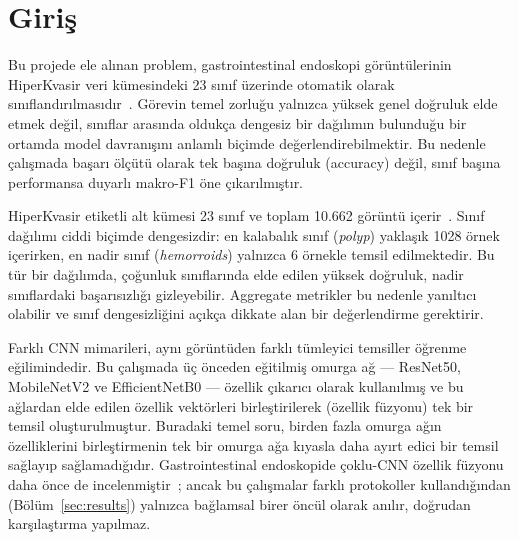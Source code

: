 \section{Giriş}
\label{sec:introduction}

Bu projede ele alınan problem, gastrointestinal endoskopi görüntülerinin
HiperKvasir veri kümesindeki 23 sınıf üzerinde otomatik olarak
sınıflandırılmasıdır~\cite{borgli2020hyperkvasir}. Görevin temel zorluğu yalnızca
yüksek genel doğruluk elde etmek değil, sınıflar arasında oldukça dengesiz bir
dağılımın bulunduğu bir ortamda model davranışını anlamlı biçimde
değerlendirebilmektir. Bu nedenle çalışmada başarı ölçütü olarak tek başına
doğruluk (accuracy) değil, sınıf başına performansa duyarlı makro-F1 öne
çıkarılmıştır.

HiperKvasir etiketli alt kümesi 23 sınıf ve toplam 10.662 görüntü
içerir~\cite{borgli2020hyperkvasir}. Sınıf dağılımı ciddi biçimde dengesizdir:
en kalabalık sınıf (\textit{polyp}) yaklaşık 1028 örnek içerirken, en nadir
sınıf (\textit{hemorroids}) yalnızca 6 örnekle temsil edilmektedir.
Bu tür bir dağılımda, çoğunluk sınıflarında elde edilen yüksek doğruluk, nadir
sınıflardaki başarısızlığı gizleyebilir. Aggregate metrikler bu nedenle
yanıltıcı olabilir ve sınıf dengesizliğini açıkça dikkate alan bir değerlendirme
gerektirir.

Farklı CNN mimarileri, aynı görüntüden farklı tümleyici temsiller öğrenme
eğilimindedir. Bu çalışmada üç önceden eğitilmiş omurga ağ --- ResNet50,
MobileNetV2 ve EfficientNetB0 --- özellik çıkarıcı olarak kullanılmış ve bu
ağlardan elde edilen özellik vektörleri birleştirilerek (özellik füzyonu) tek
bir temsil oluşturulmuştur. Buradaki temel soru, birden fazla omurga ağın
özelliklerini birleştirmenin tek bir omurga ağa kıyasla daha ayırt edici bir
temsil sağlayıp sağlamadığıdır. Gastrointestinal endoskopide çoklu-CNN özellik
füzyonu daha önce de incelenmiştir~\cite{ramamurthy2022effimix, ahmed2023hybrid};
ancak bu çalışmalar farklı protokoller kullandığından (Bölüm~\ref{sec:results})
yalnızca bağlamsal birer öncül olarak anılır, doğrudan karşılaştırma yapılmaz.

